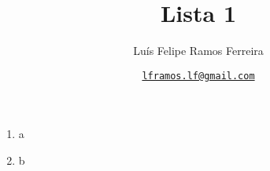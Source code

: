 \documentclass{article}
\title{Lista 1}
\author{Luís Felipe Ramos Ferreira}
\date{\href{mailto:lframos.lf@gmail.com}{\texttt{lframos.lf@gmail.com}}
}
\begin{document}
\maketitle

\begin{enumerate}

	\item a
	\item b

\end{enumerate}
\end{document}
